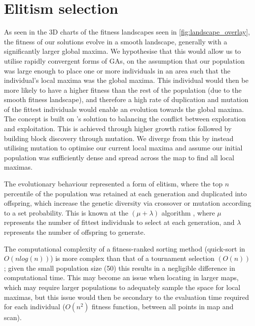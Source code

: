 \documentclass[authoryearcitations]{UoYCSproject}
\begin{document}
\section{Elitism selection}
\label{subsec:elitism_sel}
As seen in the 3D charts of the fitness landscapes seen in \autoref{fig:landscape_overlay}, the fitness of our solutions evolve in a smooth landscape, generally with a significantly larger global maxima. We hypothesise that this would allow us to utilise rapidly convergent forms of GAs, on the assumption that our population was large enough to place one or more individuals in an area such that the individual's local maxima was the global maxima. This individual would then be more likely to have a higher fitness than the rest of the population (due to the smooth fitness landscape), and therefore a high rate of duplication and mutation of the fittest individuals would enable an evolution towards the global maxima. The concept is built on \citet{David_E_Goldberg1991-es}'s solution to balancing the conflict between exploration and exploitation. This is achieved through higher growth ratios followed by building block discovery through mutation. We diverge from this by instead utilising mutation to optimise our current local maxima  and assume our initial population was sufficiently dense and spread across the map to find all local maximas. \newline
	
The evolutionary behaviour represented a form of elitism, where the top $n$ percentile of the population was retained at each generation and duplicated into offspring, which increase the genetic diversity via crossover or mutation according to a set probability. This is known at the $(\mu + \lambda)$  algorithm \cite{T_Back_D_B_Fogel_T_Michalewicz} \cite{Shapiro1992-qm}, where $\mu$ represents the number of fittest individuals to select at each generation, and $\lambda$ represents the number of offspring to generate. \newline 


The computational complexity of a fitness-ranked sorting method (quick-sort in $O(n log (n))$) is more complex  \cite{Mitchell1998-td} than that of a tournament selection $(O(n))$ \cite{David_E_Goldberg1991-es}; given the small population size (50) this results in a negligible difference in computational time. This may become an issue when locating in larger maps, which may require larger populations to adequately sample the space for local maximas, but this issue would then be secondary to the evaluation time required for each individual ($O(n^2)$  fitness function, between all points in map and scan).
\end{document}
